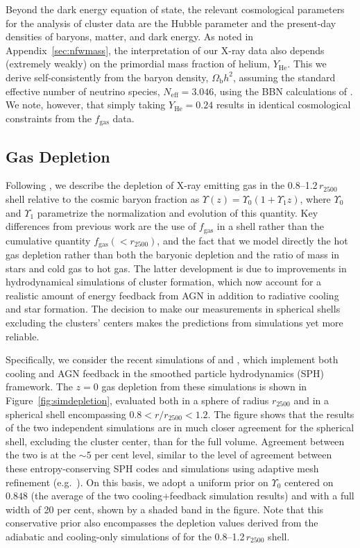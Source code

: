 \documentclass[useAMS,usenatbib,usegraphicx]{mn2e}
\newcommand*{\mysub}[2]{\ensuremath{#1_{\mathrm{#2}}}}
\newcommand*{\Omegab}{\mysub{\Omega}{b}}
\newcommand*{\fgas}{\mysub{f}{gas}}
\newcommand*{\YHe}{\mysub{Y}{He}}
\newcommand*{\appref}{Appendix}
\newcommand*{\figref}{Figure}
\newcommand*{\arsemf}{\citetalias{Allen0706.0033}}
\begin{document}
Beyond the dark energy equation of state, the relevant cosmological parameters for the analysis of cluster data are the Hubble parameter and the present-day densities of baryons, matter, and dark energy. As noted in \appref~\ref{sec:nfwmass}, the interpretation of our X-ray data also depends (extremely weakly) on the primordial mass fraction of helium, \YHe{}. This we derive self-consistently from the baryon density, $\Omegab h^2$, assuming the standard effective number of neutrino species, $\mysub{N}{eff}=3.046$, using the BBN calculations of \citet[][see also \citealt{Hamann0712.2826}]{Pisanti0705.0290}. We note, however, that simply taking $\YHe=0.24$ results in identical cosmological constraints from the \fgas{} data.

\subsection{Gas Depletion} \label{sec:fgasmodel}

Following \arsemf{}, we describe the depletion of X-ray emitting gas in the 0.8--1.2\,$r_{2500}$ shell relative to the cosmic baryon fraction as $\Upsilon(z)= \Upsilon_0(1+\Upsilon_1 z)$, where $\Upsilon_0$ and $\Upsilon_1$ parametrize the normalization and evolution of this quantity. Key differences from previous work are the use of \fgas{} in a shell rather than the cumulative quantity $\fgas(<r_{2500})$, and the fact that we model directly the hot gas depletion rather than both the baryonic depletion and the ratio of mass in stars and cold gas to hot gas. The latter development is due to improvements in hydrodynamical simulations of cluster formation, which now account for a realistic amount of energy feedback from AGN in addition to radiative cooling and star formation. The decision to make our measurements in spherical shells excluding the clusters' centers makes the predictions from simulations yet more reliable.


Specifically, we consider the recent simulations of \citet{Battaglia1209.4082} and \citet{Planelles1209.5058}, which implement both cooling and AGN feedback in the smoothed particle hydrodynamics (SPH) framework. The $z=0$ gas depletion from these simulations is shown in \figref~\ref{fig:simdepletion}, evaluated both in a sphere of radius $r_{2500}$ and in a spherical shell encompassing $0.8<r/r_{2500}<1.2$. The figure shows that the results of the two independent simulations are in much closer agreement for the spherical shell, excluding the cluster center, than for the full volume. Agreement between the two is at the $\sim5$ per cent level, similar to the level of agreement between these entropy-conserving SPH codes and simulations using adaptive mesh refinement (e.g.\ \citealt{Kravtsov0501227}). On this basis, we adopt a uniform prior on $\Upsilon_0$ centered on $0.848$ (the average of the two cooling+feedback simulation results) and with a full width of 20 per cent, shown by a shaded band in the figure. Note that this conservative prior also encompasses the depletion values derived from the adiabatic and cooling-only simulations of \citet{Planelles1209.5058} for the 0.8--1.2\,$r_{2500}$ shell.
\end{document}
